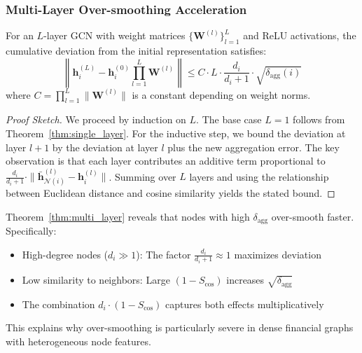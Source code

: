 \subsubsection{Multi-Layer Over-smoothing Acceleration}

\begin{theorem}
\label{thm:multi_layer}
For an $L$-layer GCN with weight matrices $\{\mathbf{W}^{(l)}\}_{l=1}^L$ and ReLU activations, the cumulative deviation from the initial representation satisfies:
\begin{equation}
\left\| \mathbf{h}_i^{(L)} - \mathbf{h}_i^{(0)} \prod_{l=1}^L \mathbf{W}^{(l)} \right\| \leq C \cdot L \cdot \frac{d_i}{d_i+1} \cdot \sqrt{\delta_{\text{agg}}(i)}
\end{equation}
where $C = \prod_{l=1}^L \|\mathbf{W}^{(l)}\|$ is a constant depending on weight norms.
\end{theorem}

\begin{proof}[Proof Sketch]
We proceed by induction on $L$. The base case $L=1$ follows from Theorem~\ref{thm:single_layer}. For the inductive step, we bound the deviation at layer $l+1$ by the deviation at layer $l$ plus the new aggregation error. The key observation is that each layer contributes an additive term proportional to $\frac{d_i}{d_i+1} \cdot \|\bar{\mathbf{h}}_{\mathcal{N}(i)}^{(l)} - \mathbf{h}_i^{(l)}\|$. Summing over $L$ layers and using the relationship between Euclidean distance and cosine similarity yields the stated bound.
\end{proof}

\begin{remark}
Theorem~\ref{thm:multi_layer} reveals that nodes with high $\delta_{\text{agg}}$ over-smooth faster. Specifically:
\begin{itemize}
    \item High-degree nodes ($d_i \gg 1$): The factor $\frac{d_i}{d_i+1} \approx 1$ maximizes deviation
    \item Low similarity to neighbors: Large $(1 - S_{\cos})$ increases $\sqrt{\delta_{\text{agg}}}$
    \item The combination $d_i \cdot (1 - S_{\cos})$ captures both effects multiplicatively
\end{itemize}
This explains why over-smoothing is particularly severe in dense financial graphs with heterogeneous node features.
\end{remark}

